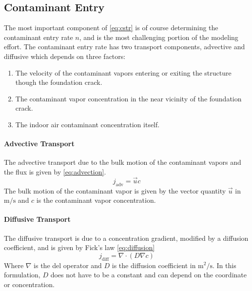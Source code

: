 \subsection{Contaminant Entry}

The most important component of \eqref{eq:cstr} is of course determining the contaminant entry rate $n$, and is the most challenging portion of the modeling effort.
The contaminant entry rate has two transport components, advective and diffusive which depends on three factors:
\begin{enumerate}
  \item The velocity of the contaminant vapors entering or exiting the structure though the foundation crack.
  \item The contaminant vapor concentration in the near vicinity of the foundation crack.
  \item The indoor air contaminant concentration itself.
\end{enumerate}

\paragraph{Advective Transport}

The advective transport due to the bulk motion of the contaminant vapors and the flux is given by \eqref{eq:advection}.
\begin{equation}\label{eq:advection} %
  j_\mathrm{adv} = \vec{u} c
\end{equation}
The bulk motion of the contaminant vapor is given by the vector quantity $\vec{u}$ in $\mathrm{m/s}$ and $c$ is the contaminant vapor concentration.\par

\paragraph{Diffusive Transport}

The diffusive transport is due to a concentration gradient, modified by a diffusion coefficient, and is given by Fick's law \eqref{eq:diffusion}
\begin{equation}\label{eq:diffusion}
  j_\mathrm{diff} = \nabla \cdot (D\nabla c)
\end{equation}
Where $\nabla$ is the del operator and $D$ is the diffusion coefficient in $\mathrm{m^2/s}$.
In this formulation, $D$ does not have to be a constant and can depend on the coordinate or concentration.\par

